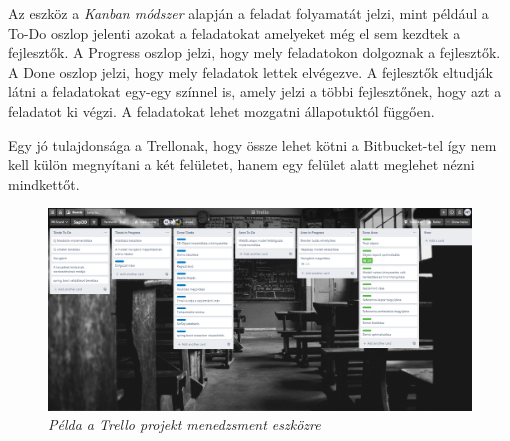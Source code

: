 Az eszköz a {\textit{Kanban módszer}\footnotemark} alapján a feladat folyamatát jelzi, mint például a To-Do oszlop jelenti azokat a feladatokat amelyeket még el sem kezdtek a fejlesztők. A Progress oszlop jelzi, hogy mely feladatokon dolgoznak a fejlesztők. A Done oszlop jelzi, hogy mely feladatok lettek elvégezve. A fejlesztők eltudják látni a feladatokat egy-egy színnel is, amely jelzi a többi fejlesztőnek, hogy azt a feladatot ki végzi. A feladatokat lehet mozgatni állapotuktól függően.

Egy jó tulajdonsága a Trellonak, hogy össze lehet kötni a Bitbucket-tel így nem kell külön megnyítani a két felületet, hanem egy felület alatt meglehet nézni mindkettőt. 
\begin{figure}[H]
	\centering
	\includegraphics[width=1\linewidth]{figures/images/trello.png}
	\caption[Példa a Trello projekt menedzsment eszközre]{\textit{Példa a Trello projekt menedzsment eszközre}}
	\label{fig:trello}
\end{figure}
